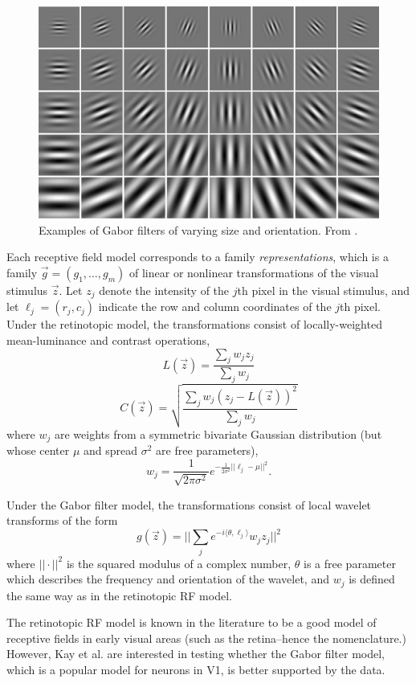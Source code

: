 \begin{figure}
\centering
\includegraphics[scale = 0.5]{Figures/Gabor.jpg}
\caption{Examples of Gabor filters of varying size and orientation.  From \cite{haghighat2015cloudid}.}
\label{fig:gabor}
\end{figure}

Each receptive field model corresponds to a family
\emph{representations}, which is a family $\vec{g} = (g_1,\hdots,
g_m)$ of linear or nonlinear transformations of the visual stimulus
$\vec{z}$.  Let $z_j$ denote the intensity of the $j$th pixel in the
visual stimulus, and let $\ell_j = (r_j, c_j)$ indicate the row and
column coordinates of the $j$th pixel.  Under the retinotopic model,
the transformations consist of locally-weighted mean-luminance and
contrast operations,
\[
L(\vec{z}) = \frac{\sum_j w_j z_j}{\sum_j w_j}
\]
\[
C(\vec{z}) = \sqrt{\frac{\sum_j w_j (z_j - L(\vec{z}))^2}{\sum_j w_j}}
\]
where $w_j$ are weights from a symmetric bivariate Gaussian
distribution (but whose center $\mu$ and spread $\sigma^2$ are free
parameters),
\[
w_j = \frac{1}{\sqrt{2\pi\sigma^2}}e^{-\frac{1}{2\sigma^2}||\ell_j - \mu||^2}.
\]

Under the Gabor filter model, the transformations consist of local
wavelet transforms of the form
\[
g(\vec{z}) = ||\sum_j e^{-i\langle\theta, \ell_j\rangle} w_j z_j||^2
\]
where $||\cdot||^2$ is the squared modulus of a complex number,
$\theta$ is a free parameter which describes the frequency and
orientation of the wavelet, and $w_j$ is defined the same way as in
the retinotopic RF model.

The retinotopic RF model is known in the literature to be a good model
of receptive fields in early visual areas (such as the retina--hence
the nomenclature.)  However, Kay et al. are interested in testing
whether the Gabor filter model, which is a popular model for neurons
in V1, is better supported by the data.

